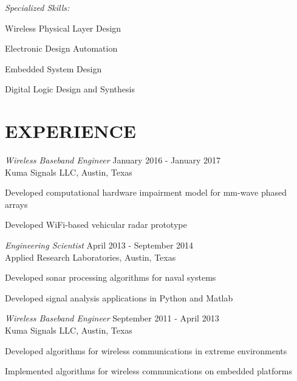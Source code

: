 \documentclass[line,margin=1in]{res}
\begin{document}
\begin{resume}
  \vspace*{-1.5\baselineskip}

  {\sl Specialized Skills:}
  \vspace*{-0.75\baselineskip}
  \begin{multicols}{2}
    \begin{compactitem}
      \item{Wireless Physical Layer Design}
      \item{Electronic Design Automation}
      \item{Embedded System Design}
      \item{Digital Logic Design and Synthesis}
    \end{compactitem}
  \end{multicols}

\section{EXPERIENCE} 

{\sl Wireless Baseband Engineer } \hfill January 2016 - January 2017 \\
Kuma Signals LLC, Austin, Texas
\begin{compactitem}
  \item Developed computational hardware impairment model for mm-wave phased arrays
  \item Developed WiFi-based vehicular radar prototype
\end{compactitem}

{\sl Engineering Scientist} \hfill April 2013 - September 2014 \\
Applied Research Laboratories, Austin, Texas
\begin{compactitem}
  \item Developed sonar processing algorithms for naval systems
  \item Developed signal analysis applications in Python and Matlab
\end{compactitem}

{\sl Wireless Baseband Engineer} \hfill September 2011 - April 2013 \\
Kuma Signals LLC, Austin, Texas
\begin{compactitem}  
  \item Developed algorithms for wireless communications in extreme environments
  \item Implemented algorithms for wireless communications on embedded platforms
\end{compactitem}


\end{resume}
\end{document}
